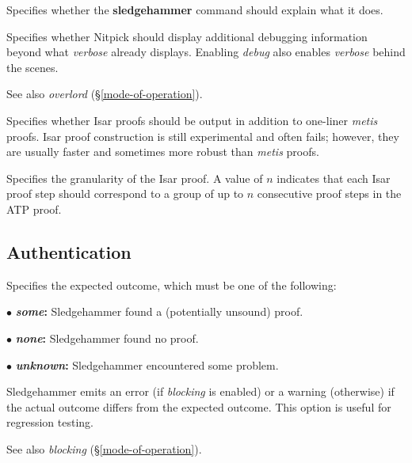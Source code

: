 \documentclass[a4paper,12pt]{article}
\begin{document}
\begin{enum}

Specifies whether the \textbf{sledgehammer} command should explain what it does.

Specifies whether Nitpick should display additional debugging information beyond
what \textit{verbose} already displays. Enabling \textit{debug} also enables
\textit{verbose} behind the scenes.

\nopagebreak
{\small See also \textit{overlord} (\S\ref{mode-of-operation}).}

Specifies whether Isar proofs should be output in addition to one-liner
\textit{metis} proofs. Isar proof construction is still experimental and often
fails; however, they are usually faster and sometimes more robust than
\textit{metis} proofs.

Specifies the granularity of the Isar proof. A value of $n$ indicates that each
Isar proof step should correspond to a group of up to $n$ consecutive proof
steps in the ATP proof.

\end{enum}

\subsection{Authentication}
\label{authentication}

\begin{enum}
Specifies the expected outcome, which must be one of the following:

\begin{enum}
\item[$\bullet$] \textbf{\textit{some}:} Sledgehammer found a (potentially unsound) proof.
\item[$\bullet$] \textbf{\textit{none}:} Sledgehammer found no proof.
\item[$\bullet$] \textbf{\textit{unknown}:} Sledgehammer encountered some problem.
\end{enum}

Sledgehammer emits an error (if \textit{blocking} is enabled) or a warning
(otherwise) if the actual outcome differs from the expected outcome. This option
is useful for regression testing.

\nopagebreak
{\small See also \textit{blocking} (\S\ref{mode-of-operation}).}
\end{enum}

\let\em=\sl
{}

\end{document}

